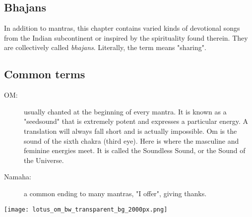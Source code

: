   \subsection*{Bhajans}
  In addition to mantras, this chapter contains varied kinds of devotional songs from the Indian
  subcontinent or inspired by the spirituality found therein. They are collectively called 
  \emph{bhajans}. Literally, the term means "sharing".

  \subsection*{Common terms}
  \begin{description}
   \item[OM:] usually chanted at the beginning of every mantra. It is known as a "seedsound" that 
     is extremely potent and expresses a particular energy. A translation will always fall short 
     and is actually impossible. Om is the sound of the sixth chakra (third eye). Here is where 
     the masculine and feminine energies meet. It is called the Soundless Sound, or the Sound of 
     the Universe.
   \item[Namaha:] a common ending to many mantras, "I offer", giving thanks.
  \end{description}
  \begin{center}%
    \vspace*{\fill}%
    \texttt{[image: lotus\_om\_bw\_transparent\_bg\_2000px.png]}%
    \vspace*{\fill}%
  \end{center}%
